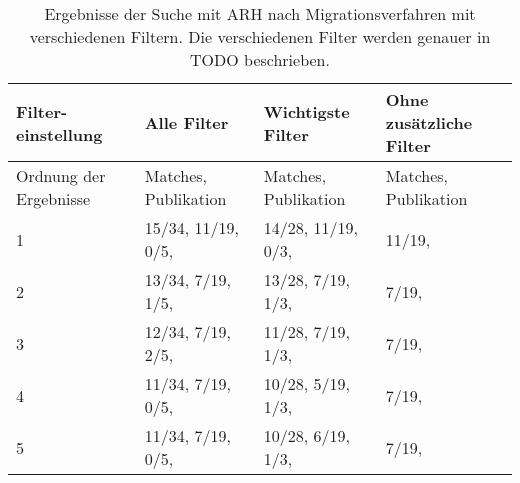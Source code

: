 \begin{table}[!h]
  \centering
  \begin{tabular}{m{2cm} m{4.3cm} m{4.3cm} m{2.5cm}}
    \toprule
    \textbf{Filter-einstellung} & \textbf{Alle Filter} & \textbf{Wichtigste Filter} & \textbf{Ohne zusätzliche Filter} \\ \hline
    Ordnung der Ergebnisse & Matches, Publikation & Matches, Publikation & Matches, Publikation \\ \midrule
    1 & 15/34, 11/19, 0/5, \cite{arh-result-no-filter-1} & 14/28, 11/19, 0/3, \cite{arh-result-no-filter-1} & 11/19, \cite{arh-result-no-filter-1}  \\ \hline
    2 & 13/34, 7/19, 1/5, \cite{arh-result-no-filter-4} & 13/28, 7/19, 1/3, \cite{arh-result-no-filter-4} & 7/19, \cite{arh-result-no-filter-2} \\ \hline
    3 & 12/34, 7/19, 2/5, \cite{arh-result-no-filter-2} & 11/28, 7/19, 1/3,  \cite{arh-result-no-filter-2} & 7/19, \cite{arh-result-no-filter-3} \\ \hline
    4 & 11/34, 7/19, 0/5, \cite{arh-result-no-filter-3} & 10/28, 5/19, 1/3, \cite{arh-result-important-filter-4} &  7/19, \cite{arh-result-no-filter-4} \\ \hline
    5 & 11/34, 7/19, 0/5, \cite{arh-result-no-filter-5} & 10/28, 6/19, 1/3, \cite{arh-result-important-filter-5} &  7/19, \cite{arh-result-no-filter-5} \\
    \bottomrule
  \end{tabular}
  \caption[Surchergebnisse des ARH von Migrationsverfahren mit verschiedenen Filtern]{
    Ergebnisse der Suche mit ARH nach Migrationsverfahren mit verschiedenen Filtern.
    Die verschiedenen Filter werden genauer in TODO beschrieben.
  }
  \label{tab:phase2-filter-results}
\end{table}
